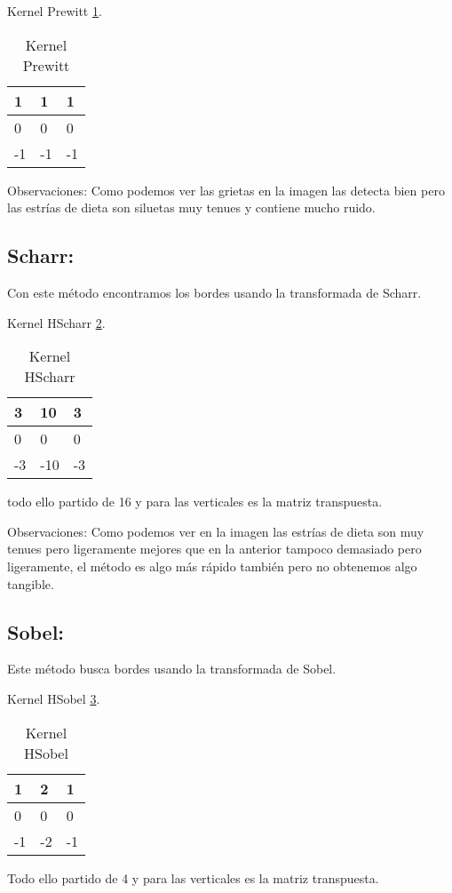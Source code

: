 Kernel Prewitt \ref{F_k2}.
\begin{table}[]
	\centering
	\caption{Kernel Prewitt}
	\label{F_k2}
	\begin{tabular}{|l|l|l|}
		\hline
		1  & 1   & 1 \\ \hline
		0  & 0   & 0 \\ \hline
		-1 & -1  & -1 \\ \hline
	\end{tabular}
\end{table}



Observaciones:
Como podemos ver las grietas en la imagen las detecta bien pero las estrías de dieta son siluetas muy tenues y contiene mucho ruido.


\subsection{Scharr:}
Con este método encontramos los bordes usando la transformada de Scharr.

Kernel HScharr \ref{F_k3}.
\begin{table}[]
	\centering
	\caption{Kernel HScharr}
	\label{F_k3}
	\begin{tabular}{|l|l|l|}
		\hline
		3  & 10  & 3 \\ \hline
		0  & 0   & 0 \\ \hline
		-3 & -10 & -3 \\ \hline
	\end{tabular}
\end{table}
todo ello partido de 16 y para las verticales es la matriz transpuesta. 




Observaciones:
Como podemos ver en la imagen las estrías de dieta son muy tenues pero ligeramente mejores que en la anterior tampoco demasiado pero ligeramente, el método es algo más rápido también pero no obtenemos algo tangible.




\subsection{Sobel:}
Este método busca bordes usando la transformada de Sobel.


Kernel HSobel \ref{F_k4}.
\begin{table}[]
	\centering
	\caption{Kernel HSobel}
	\label{F_k4}
	\begin{tabular}{|l|l|l|}
		\hline
		1  & 2  & 1 \\ \hline
		0  & 0  & 0 \\ \hline
		-1 & -2 & -1 \\ \hline
	\end{tabular}
\end{table}
Todo ello partido de 4 y para las verticales es la matriz transpuesta. 





